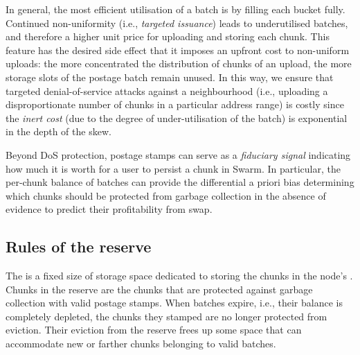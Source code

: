 In general, the most efficient utilisation of a batch is by filling each bucket fully. 
%
%
%       
Continued non-uniformity (i.e., \emph{targeted issuance}) leads to underutilised batches, and therefore a higher unit price for uploading and storing each chunk. This feature has the desired side effect that it imposes an upfront cost to non-uniform uploads: the more concentrated the distribution of chunks of an upload, the more storage slots of the postage batch remain unused. In this way, we ensure that targeted denial-of-service attacks against a neighbourhood (i.e., uploading a disproportionate number of chunks in a particular address range) is costly since the \emph{inert cost} (due to the degree of under-utilisation of the batch) is exponential in the depth of the skew.

Beyond DoS protection, postage stamps can serve as a \emph{fiduciary signal} indicating how much it is worth for a user to persist a chunk in Swarm. In particular, the per-chunk balance of batches can provide the differential a priori bias determining which chunks should be protected from garbage collection in the absence of evidence to predict their profitability from swap. 



\subsection{Rules of the reserve}\label{sec:reserve}


The  is a fixed size of storage space dedicated to storing the chunks in the node's . Chunks in the reserve are the chunks that are protected against garbage collection with valid postage stamps. When batches expire, i.e., their balance is completely depleted, the chunks they stamped are no longer protected from eviction. Their eviction from the reserve frees up some space that can accommodate new or farther chunks belonging to valid batches.


